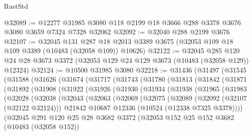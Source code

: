 \begin{lexlean}{RustStd}
\begin{coremodule}
@32089 := @12277 @31985 @3080 @118 @2199 @18 @3666 @288 @3378 @3676 @3080 @3659 @7324 @7328 @32062
@32092 := @32040 @288 @2199 @3676
@32107 := @32045
    @131
    @287
    @18
    @2013
    @3389
    @3675
    (@32053 @109 @18 @109 @3389 (@10483 (@32058 @109)) @10626)
@32122 := @32045
    @285
    @120
    @24
    @28
    @3673
    @3372
    (@32053 @129 @24 @129 @3673 (@10483 (@32058 @129)) @12324)
@32124 := @10500 @31985 @3080
@32218 := @31436
    (@31497
      (@31545
        (@31588
          (@31626
            (@31674
              (@31717
                (@31743
                  (@31780
                    (@31813
                      (@31842
                        (@31871
                          (@31892
                            (@31908
                              (@31922
                                (@31926
                                  (@31930
                                    (@31934
                                      (@31938
                                        (@31965
                                          (@31983
                                            (@32028
                                              (@32038
                                                (@32043
                                                  (@32063
                                                    (@32069
                                                      (@32075
                                                        (@32089
                                                          (@32092 (@32107 (@32122 @32124)))
                                                          @21842
                                                          @10687
                                                          @12336
                                                          (@10524 (@12338 @7325 @3378))))
                                                      (@32045
                                                        @291
                                                        @120
                                                        @25
                                                        @28
                                                        @3682
                                                        @3372
                                                        (@32053
                                                          @152
                                                          @25
                                                          @152
                                                          @3682
                                                          (@10483 (@32058 @152))

\end{coremodule}
\end{lexlean}
